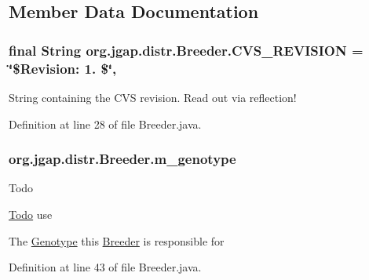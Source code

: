 \subsection{Member Data Documentation}
\hypertarget{classorg_1_1jgap_1_1distr_1_1_breeder_a33945fdaddc67a98814f59c61ce919bf}{
\subsubsection[{C\-V\-S\-\_\-\-R\-E\-V\-I\-S\-I\-O\-N}]{\setlength{\rightskip}{0pt plus 5cm}final String org.\-jgap.\-distr.\-Breeder.\-C\-V\-S\-\_\-\-R\-E\-V\-I\-S\-I\-O\-N = \char`\"{}\$Revision\-: 1. \$\char`\"{}\hspace{0.3cm}{\ttfamily [static]}, {\ttfamily [private]}}}\label{classorg_1_1jgap_1_1distr_1_1_breeder_a33945fdaddc67a98814f59c61ce919bf}
String containing the C\-V\-S revision. Read out via reflection! 

Definition at line 28 of file Breeder.\-java.

\hypertarget{classorg_1_1jgap_1_1distr_1_1_breeder_a86129a6e573ed2ca9961931713250483}{
\subsubsection[{m\-\_\-genotype}]{ org.\-jgap.\-distr.\-Breeder.\-m\-\_\-genotype\hspace{0.3cm}{\ttfamily [private]}}}\label{classorg_1_1jgap_1_1distr_1_1_breeder_a86129a6e573ed2ca9961931713250483}
\begin{DoxyRefDesc}{Todo}
\item[\hyperlink{todo__todo000057}{Todo}]use \end{DoxyRefDesc}
The \hyperlink{classorg_1_1jgap_1_1_genotype}{Genotype} this \hyperlink{classorg_1_1jgap_1_1distr_1_1_breeder}{Breeder} is responsible for 

Definition at line 43 of file Breeder.\-java.



